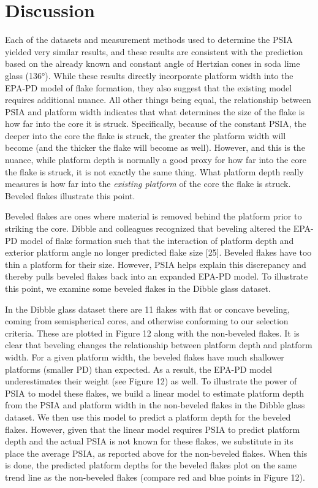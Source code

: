 \documentclass[10pt,letterpaper]{article}
\begin{document}
\hypertarget{discussion}{%
\section{Discussion}\label{discussion}}

Each of the datasets and measurement methods used to determine the PSIA
yielded very similar results, and these results are consistent with the
prediction based on the already known and constant angle of Hertzian
cones in soda lime glass (136°). While these results directly
incorporate platform width into the EPA-PD model of flake formation,
they also suggest that the existing model requires additional nuance.
All other things being equal, the relationship between PSIA and platform
width indicates that what determines the size of the flake is how far
into the core it is struck. Specifically, because of the constant PSIA,
the deeper into the core the flake is struck, the greater the platform
width will become (and the thicker the flake will become as well).
However, and this is the nuance, while platform depth is normally a good
proxy for how far into the core the flake is struck, it is not exactly
the same thing. What platform depth really measures is how far into the
\emph{existing platform} of the core the flake is struck. Beveled flakes
illustrate this point.

Beveled flakes are ones where material is removed behind the platform
prior to striking the core. Dibble and colleagues recognized that
beveling altered the EPA-PD model of flake formation such that the
interaction of platform depth and exterior platform angle no longer
predicted flake size {[}25{]}. Beveled flakes have too thin a platform
for their size. However, PSIA helps explain this discrepancy and thereby
pulls beveled flakes back into an expanded EPA-PD model. To illustrate
this point, we examine some beveled flakes in the Dibble glass dataset.

In the Dibble glass dataset there are 11 flakes with flat or concave
beveling, coming from semispherical cores, and otherwise conforming to
our selection criteria. These are plotted in Figure 12 along with the
non-beveled flakes. It is clear that beveling changes the relationship
between platform depth and platform width. For a given platform width,
the beveled flakes have much shallower platforms (smaller PD) than
expected. As a result, the EPA-PD model underestimates their weight (see
Figure 12) as well. To illustrate the power of PSIA to model these
flakes, we build a linear model to estimate platform depth from the PSIA
and platform width in the non-beveled flakes in the Dibble glass
dataset. We then use this model to predict a platform depth for the
beveled flakes. However, given that the linear model requires PSIA to
predict platform depth and the actual PSIA is not known for these
flakes, we substitute in its place the average PSIA, as reported above
for the non-beveled flakes. When this is done, the predicted platform
depths for the beveled flakes plot on the same trend line as the
non-beveled flakes (compare red and blue points in Figure 12).
\end{document}
